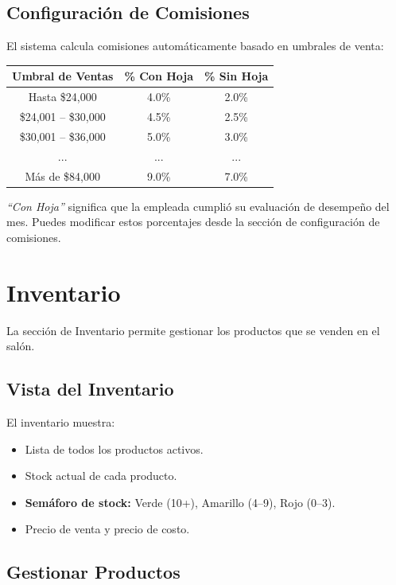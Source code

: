 \documentclass[12pt,a4paper]{article}
\begin{document}
\subsection{Configuración de Comisiones}

El sistema calcula comisiones automáticamente basado en umbrales de venta:

\begin{center}
\begin{tabular}{@{}ccc@{}}
\toprule
\textbf{Umbral de Ventas} & \textbf{\% Con Hoja} & \textbf{\% Sin Hoja} \\
\midrule
Hasta \$24,000 & 4.0\% & 2.0\% \\
\$24,001 -- \$30,000 & 4.5\% & 2.5\% \\
\$30,001 -- \$36,000 & 5.0\% & 3.0\% \\
... & ... & ... \\
Más de \$84,000 & 9.0\% & 7.0\% \\
\bottomrule
\end{tabular}
\end{center}

\textit{``Con Hoja''} significa que la empleada cumplió su evaluación de desempeño del mes. Puedes modificar estos porcentajes desde la sección de configuración de comisiones.

\newpage
\section{Inventario}

La sección de Inventario permite gestionar los productos que se venden en el salón.

\subsection{Vista del Inventario}

El inventario muestra:
\begin{itemize}[leftmargin=*]
  \item Lista de todos los productos activos.
  \item Stock actual de cada producto.
  \item \textbf{Semáforo de stock:} Verde (10+), Amarillo (4--9), Rojo (0--3).
  \item Precio de venta y precio de costo.
\end{itemize}

\subsection{Gestionar Productos}
\end{document}

